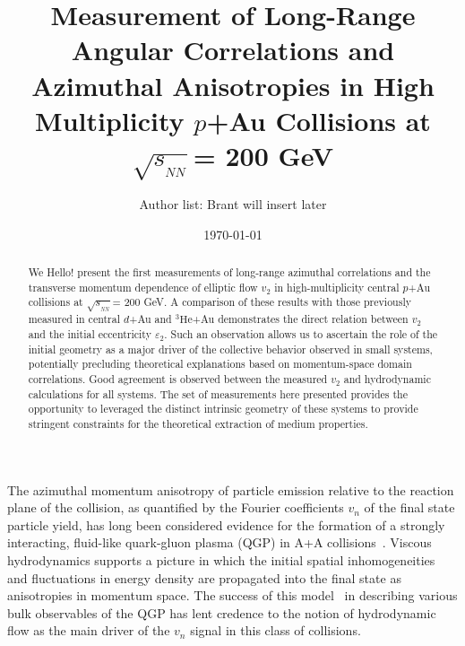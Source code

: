 \documentclass[%
reprint,
showpacs,preprintnumbers,
 amsmath,amssymb,
 aps,
]{revtex4-1}
\newcommand{\sqsn}{\mbox{$\sqrt{s_{_{NN}}}$}\xspace}
\newcommand{\dau}{\mbox{$d$+Au}\xspace}
\newcommand{\pau}{\mbox{$p$+Au}\xspace}
\newcommand{\hau}{\mbox{$^3\text{He}$+Au}\xspace}
\begin{document}
\title{Measurement of Long-Range Angular Correlations and Azimuthal Anisotropies in High Multiplicity \pau Collisions at \sqsn = 200 GeV}%

\author{Author list: Brant will insert later}

\date{\today}%

\begin{abstract}
We Hello! present the first measurements of long-range azimuthal correlations and the transverse momentum dependence of elliptic flow $v_2$ in high-multiplicity central \pau collisions at \sqsn = 200 GeV. A comparison of these results with those previously measured in central \dau and \hau demonstrates the direct relation between $v_2$ and the initial eccentricity $\varepsilon_2$. Such an observation allows us to ascertain the role of the initial geometry as a major driver of the collective behavior observed in small systems, potentially precluding theoretical explanations based on momentum-space domain correlations. Good agreement is observed between the measured $v_2$ and hydrodynamic calculations for all systems. The set of measurements here presented provides the opportunity to leveraged the distinct intrinsic geometry of these systems to provide stringent constraints for the theoretical extraction of medium properties. 
\end{abstract}

\maketitle

The azimuthal momentum anisotropy of particle emission relative to the reaction plane of the collision, as quantified by the Fourier coefficients $v_n$ of the final state particle yield, has long been considered evidence for the formation of a strongly interacting, fluid-like quark-gluon plasma (QGP) in A+A collisions~\cite{Snellings:2011sz}. Viscous hydrodynamics supports a picture in which the initial spatial inhomogeneities and fluctuations in energy density are propagated into the final state as anisotropies in momentum space.  The success of this model~\cite{Luzum:2008cw} in describing various bulk observables of the QGP has lent credence to the notion of hydrodynamic flow as the main driver of the $v_{n}$ signal in this class of collisions.
\end{document}
